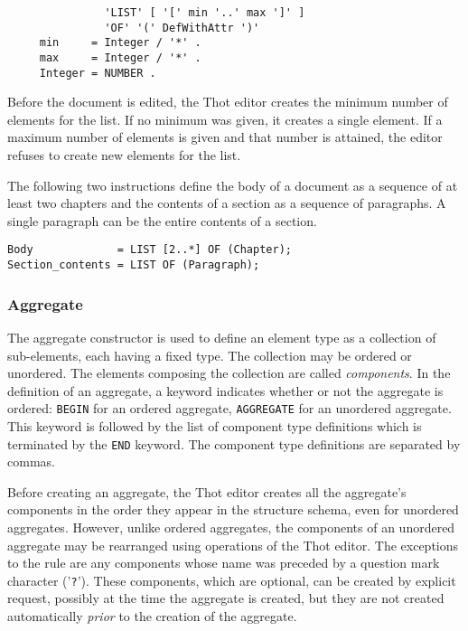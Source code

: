 \begin{verbatim}
               'LIST' [ '[' min '..' max ']' ]
               'OF' '(' DefWithAttr ')'
     min     = Integer / '*' .
     max     = Integer / '*' .
     Integer = NUMBER .
\end{verbatim}

Before the document is edited, the Thot editor creates the minimum
number of elements for the list.  If no minimum was given, it creates
a single element.  If a maximum number of elements is given and that
number is attained, the editor refuses to create new elements for the
list.

\begin{example}
The following two instructions define the body of a document as a
sequence of at least two chapters and the contents of a section as a
sequence of paragraphs.  A single paragraph can be the entire contents
of a section.

\begin{verbatim}
Body             = LIST [2..*] OF (Chapter);
Section_contents = LIST OF (Paragraph);
\end{verbatim}
\end{example}

\subsubsection{Aggregate}

The aggregate constructor is used to define an element type as a
collection of sub-elements, each having a fixed type.  The collection
may be ordered or unordered.  The elements composing the collection
are called {\em components}.  In the definition of an aggregate, a
keyword indicates whether or not the aggregate is ordered: {\tt BEGIN}
for an ordered aggregate, {\tt AGGREGATE} for an unordered aggregate.
This keyword is followed by the list of component type definitions which is
terminated by the {\tt END} keyword.  The component type definitions
are separated by commas.

Before creating an aggregate, the Thot editor creates all the
aggregate's components in the order they appear in the structure
schema, even for unordered aggregates.  However, unlike ordered
aggregates, the components of an unordered aggregate may be rearranged
using operations of the Thot editor.  The exceptions to the rule are
any components whose name was preceded by a question mark character
('\verb|?|').  These components, which are optional, can be created by
explicit request, possibly at the time the aggregate is created, but
they are not created automatically {\em prior} to the creation of the
aggregate.

